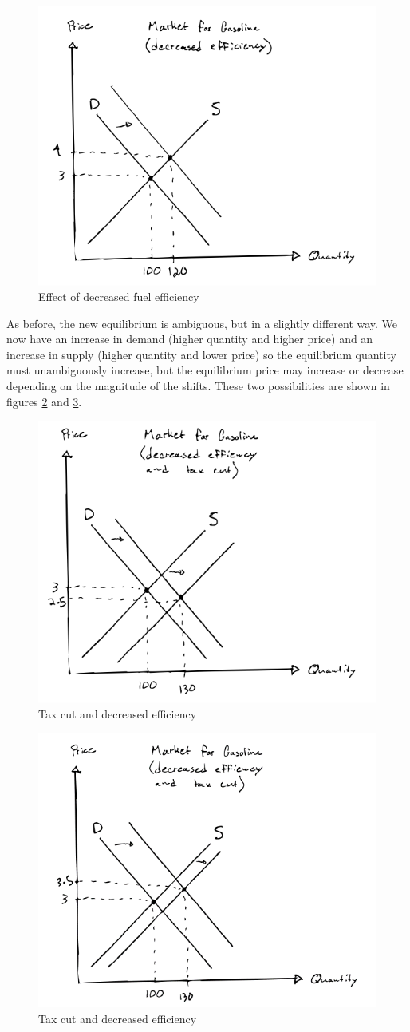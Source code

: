 \documentclass[12pt]{article}
\begin{document}
\begin{figure}
    \centering
    \includegraphics[width=.6\textwidth]{decrease_efficiency.png}
    \caption{Effect of decreased fuel efficiency}
    \label{fig:decrease_efficiency}
\end{figure}

As before, the new equilibrium is ambiguous, but in a slightly different way. We now have an increase in demand (higher quantity and higher price) and an increase in supply (higher quantity and lower price) so the equilibrium quantity must unambiguously increase, but the equilibrium price may increase or decrease depending on the magnitude of the shifts. These two possibilities are shown in figures \ref{fig:both_changes_2a} and \ref{fig:both_changes_2b}.

\begin{figure}
    \centering
    \includegraphics[width=.6\textwidth]{both_changes_2a.png}
    \caption{Tax cut and decreased efficiency}
    \label{fig:both_changes_2a}
\end{figure}

\begin{figure}
    \centering
    \includegraphics[width=.6\textwidth]{both_changes_2b.png}
    \caption{Tax cut and decreased efficiency}
    \label{fig:both_changes_2b}
\end{figure}
\end{document}
